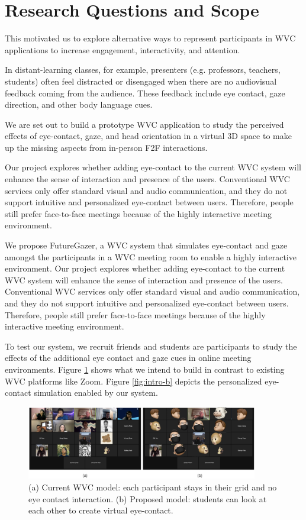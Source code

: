 \section{Research Questions and Scope}

This motivated us to explore alternative ways to represent participants in WVC applications to increase engagement, interactivity, and attention. 

In distant-learning classes, for example, presenters (e.g. professors, teachers, students) often feel distracted or disengaged when there are no audiovisual feedback coming from the audience. These feedback include eye contact, gaze direction, and other body language cues.

We are set out to build a prototype WVC application to study the perceived effects of eye-contact, gaze, and head orientation in a virtual 3D space to make up the missing aspects from in-person F2F interactions.

Our project explores whether adding eye-contact to the current WVC system will enhance the sense of interaction and presence of the users. Conventional WVC services only offer standard visual and audio communication, and they do not support intuitive and personalized eye-contact between users. Therefore, people still prefer face-to-face meetings because of the highly interactive meeting environment.

We propose FutureGazer, a WVC system that simulates eye-contact and gaze amongst the participants in a WVC meeting room to enable a highly interactive environment. Our project explores whether adding eye-contact to the current WVC system will enhance the sense of interaction and presence of the users. Conventional WVC services only offer standard visual and audio communication, and they do not support intuitive and personalized eye-contact between users. Therefore, people still prefer face-to-face meetings because of the highly interactive meeting environment\cite{rn42}.

To test our system, we recruit friends and students are participants to study the effects of the additional eye contact and gaze cues in online meeting environments. Figure \ref{fig:intro-a} shows what we intend to build in contrast to existing WVC platforms like Zoom. Figure \ref{fig:intro-b} depicts the personalized eye-contact simulation enabled by our system.

\begin{figure}
	\centering
 	\includegraphics[width=0.9\textwidth]{introA.png}
	\caption{(a) Current WVC model: each participant stays in their grid and no eye contact interaction. (b) Proposed model: students can look at each other to create virtual eye-contact.}
	\label{fig:intro-a}
\end{figure}

